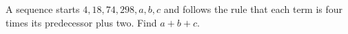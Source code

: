 A sequence starts $ 4,18,74,298,a,b,c $ and follows the rule that each term is four times its predecessor plus two. Find $ a+b+c $.
